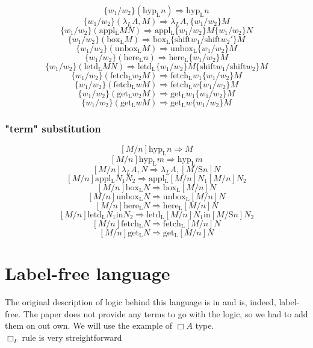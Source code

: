 \documentclass[12pt]{article}
\begin{document}
$$ \{ w_1 / w_2 \} (\mathrm{hyp_L} n) \Rightarrow \mathrm{hyp_L} n $$  
$$ \{ w_1 / w_2 \} (\lambda_L A, M) \Rightarrow \lambda_L A, \{w_1 / w_2 \} M $$  
$$ \{ w_1 / w_2 \} (\mathrm{appl_L} M N) \Rightarrow \mathrm{appl_L}  \{w_1 / w_2 \}M \{w_1 / w_2 \} N$$  
$$ \{ w_1 / w_2 \} (\mathrm{box_L} M) \Rightarrow 
			   \mathrm{box_L} \{\mathrm{shift} w_1 / \mathrm{shift} w_2' \} M $$  
$$ \{ w_1 / w_2 \} (\mathrm{unbox_L} M) \Rightarrow \mathrm{unbox_L} \{w_1 / w_2 \} M $$  
$$ \{ w_1 / w_2 \} (\mathrm{here_L} n) \Rightarrow \mathrm{here_L} \{w_1 / w_2 \} M $$  
$$ \{ w_1 / w_2 \} (\mathrm{letd_L} M N) \Rightarrow 
			    \mathrm{letd_L} \{w_1 / w_2 \}M \{\mathrm{shift} w_1 / \mathrm{shift} w_2 \} M$$  
$$ \{ w_1 / w_2 \} (\mathrm{fetch_L} w_2 M) \Rightarrow \mathrm{fetch_L} w_1 \{w_1 / w_2 \} M $$  
$$ \{ w_1 / w_2 \} (\mathrm{fetch_L} w M) \Rightarrow \mathrm{fetch_L} w \{w_1 / w_2 \} M $$  
$$ \{ w_1 / w_2 \} (\mathrm{get_L} w_2 M) \Rightarrow \mathrm{get_L} w_1 \{w_1 / w_2 \} M $$  
$$ \{ w_1 / w_2 \} (\mathrm{get_L} w M) \Rightarrow \mathrm{get_L} w \{w_1 / w_2 \} M $$ 

\subsubsection{"term" substitution}

$$ [ M / n ] \mathrm{hyp_L} n \Rightarrow M $$
$$ [ M / n ] \mathrm{hyp_L} m \Rightarrow \mathrm{hyp_L} m $$
$$ [ M / n ] \lambda_L A, N \Rightarrow \lambda_L A, [M / \mathrm{S } n] N$$
$$ [ M / n ] \mathrm{appl_L} N_1 N_2 \Rightarrow \mathrm{appl_L} [M / n] N_1 [M / n] N_2$$
$$ [ M / n ] \mathrm{box_L} N \Rightarrow \mathrm{box_L} [M / n] N $$
$$ [ M / n ] \mathrm{unbox_L} N \Rightarrow \mathrm{unbox_L} [M / n ]N $$
$$ [ M / n ] \mathrm{here_L} N \Rightarrow \mathrm{here_L} [M / n ]N $$
$$ [ M / n ] \mathrm{letd_L} N_1 \mathrm{in} N_2 \Rightarrow \mathrm{letd_L} [M / n ]N_1 \mathrm{ in } [M/\mathrm{S } n]N_2 $$
$$ [ M / n ] \mathrm{fetch_L} N \Rightarrow \mathrm{fetch_L} [M / n ]N $$
$$ [ M / n ] \mathrm{get_L} N \Rightarrow \mathrm{get_L} [M / n ]N $$

\section{Label-free language}

The original description of logic behind this language is in \cite{galmiche11} and is, indeed, label-free.
The paper does not provide any terms to go with the logic, so we had to add them on out own. We will use the example of $\Box A$ type.\\
$\Box_I$ rule is very streightforward\\
\end{document}
